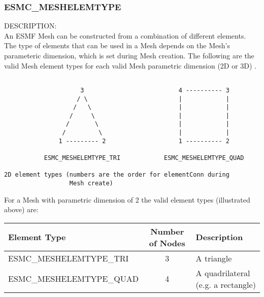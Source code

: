 
\subsubsection{ESMC\_MESHELEMTYPE}
\label{const:cmeshelemtype}

 {\sf DESCRIPTION:\\}
 An ESMF Mesh can be constructed from a combination of different elements. The type of elements that can
be used in a Mesh depends on the Mesh's parameteric dimension, which is set during Mesh creation. The
following are the valid Mesh element types for each valid Mesh parametric dimension (2D or 3D) .

\medskip

\begin{verbatim}

                     3                          4 ---------- 3
                    / \                         |            |  
                   /   \                        |            |
                  /     \                       |            |
                 /       \                      |            |
                /         \                     |            |
               1 --------- 2                    1 ---------- 2

           ESMC_MESHELEMTYPE_TRI            ESMC_MESHELEMTYPE_QUAD

2D element types (numbers are the order for elementConn during 
                  Mesh create)

\end{verbatim}

For a Mesh with parametric dimension of 2 the valid element types (illustrated above) are:

\smallskip

\begin{tabular}{|l|c|l|}
\hline
Element Type &  Number of Nodes  & Description \\
\hline
ESMC\_MESHELEMTYPE\_TRI  & 3 & A triangle \\
ESMC\_MESHELEMTYPE\_QUAD & 4 & A quadrilateral (e.g. a rectangle) \\
\hline
\end{tabular}

\medskip
\medskip

